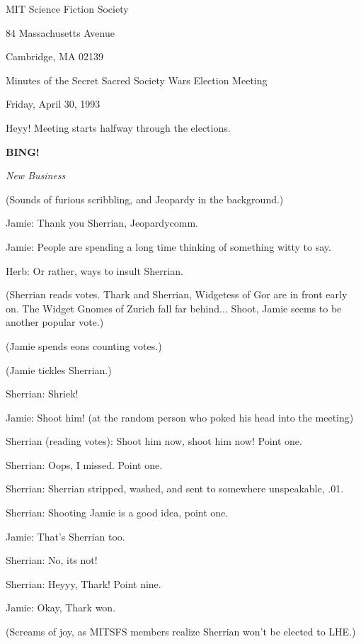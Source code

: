 \documentclass[12pt]{article}
\newcommand{\bing}{{\bf BING!} }
\newcommand{\goto}[1]{\bing \vskip 12pt \centerline{{\em{#1}}}}
\begin{document}
\begin{center}

MIT Science Fiction Society 

84 Massachusetts Avenue

Cambridge, MA 02139

\vspace{12pt}

Minutes of the Secret Sacred Society Wars Election Meeting

Friday, April 30, 1993

\end{center}
 
\vspace{18pt}

\setlength{\parskip}{6pt}

\noindent
Heyy! Meeting starts halfway through the elections.

\goto{New Business}

(Sounds of furious scribbling, and Jeopardy in the background.)

Jamie: Thank you Sherrian, Jeopardycomm.

Jamie: People are spending a long time thinking of something witty to say.

Herb: Or rather, ways to insult Sherrian.

(Sherrian reads votes. Thark and Sherrian, Widgetess of Gor are in front early on. The Widget Gnomes of Zurich fall far behind... Shoot, Jamie seems to be
another popular vote.)

(Jamie spends eons counting votes.)

(Jamie tickles Sherrian.)

Sherrian: Shriek!

Jamie: Shoot him! (at the random person who poked his head into the meeting)

Sherrian (reading votes): Shoot him now, shoot him now! Point one.

Sherrian: Oops, I missed. Point one.

Sherrian: Sherrian stripped, washed, and sent to somewhere unspeakable, .01.

Sherrian: Shooting Jamie is a good idea, point one.

Jamie: That's Sherrian too.

Sherrian: No, its not!

Sherrian: Heyyy, Thark! Point nine.

Jamie: Okay, Thark won.

(Screams of joy, as MITSFS members realize Sherrian won't be elected to LHE.)
\end{document}
